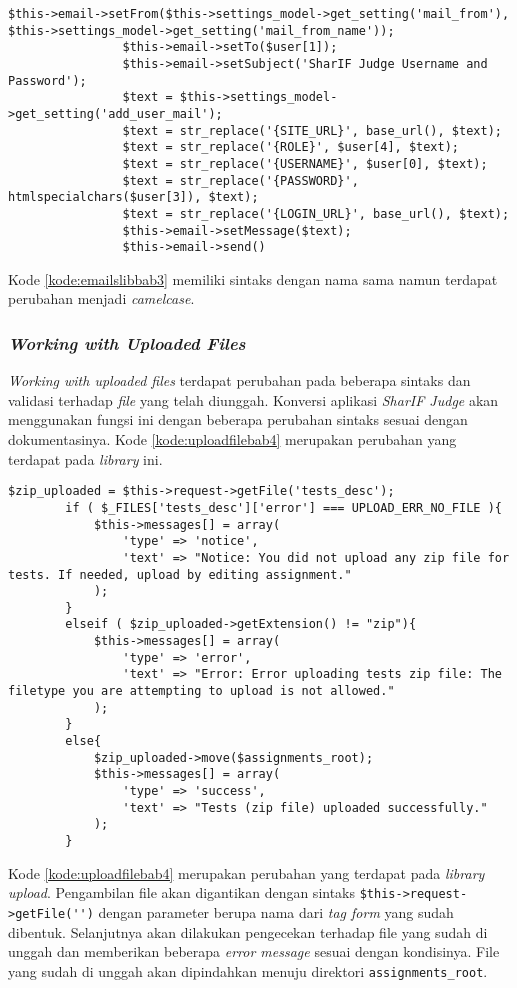 \begin{lstlisting}[caption=Perubahan penggunaan sintaks pada \textit{library emails}, label=kode:emailslibbab3]
$this->email->setFrom($this->settings_model->get_setting('mail_from'), $this->settings_model->get_setting('mail_from_name'));
				$this->email->setTo($user[1]);
				$this->email->setSubject('SharIF Judge Username and Password');
				$text = $this->settings_model->get_setting('add_user_mail');
				$text = str_replace('{SITE_URL}', base_url(), $text);
				$text = str_replace('{ROLE}', $user[4], $text);
				$text = str_replace('{USERNAME}', $user[0], $text);
				$text = str_replace('{PASSWORD}', htmlspecialchars($user[3]), $text);
				$text = str_replace('{LOGIN_URL}', base_url(), $text);
				$this->email->setMessage($text);
				$this->email->send()
\end{lstlisting}

Kode \ref{kode:emailslibbab3} memiliki sintaks dengan nama sama namun terdapat perubahan menjadi \textit{camelcase}.

\subsubsection{\textit{Working with Uploaded Files}}
\textit{Working with uploaded files} terdapat perubahan pada beberapa sintaks dan validasi terhadap \textit{file} yang telah diunggah. Konversi aplikasi \textit{SharIF Judge} akan menggunakan fungsi ini dengan beberapa perubahan sintaks sesuai dengan dokumentasinya. Kode \ref{kode:uploadfilebab4} merupakan perubahan yang terdapat pada \textit{library} ini. 
\begin{lstlisting}[caption=Perancangan perubahan \textit{library upload} pada \textit{CodeIgniter 4}, label=kode:uploadfilebab4]
$zip_uploaded = $this->request->getFile('tests_desc');
		if ( $_FILES['tests_desc']['error'] === UPLOAD_ERR_NO_FILE ){
			$this->messages[] = array(
				'type' => 'notice',
				'text' => "Notice: You did not upload any zip file for tests. If needed, upload by editing assignment."
			);
		}
		elseif ( $zip_uploaded->getExtension() != "zip"){
			$this->messages[] = array(
				'type' => 'error',
				'text' => "Error: Error uploading tests zip file: The filetype you are attempting to upload is not allowed."
			);
		}
		else{
			$zip_uploaded->move($assignments_root);
			$this->messages[] = array(
				'type' => 'success',
				'text' => "Tests (zip file) uploaded successfully."
			);
		}
\end{lstlisting}

Kode \ref{kode:uploadfilebab4} merupakan perubahan yang terdapat pada \textit{library upload}. Pengambilan file akan digantikan dengan sintaks \verb|$this->request->getFile('')| dengan parameter berupa nama dari \textit{tag form} yang sudah dibentuk. Selanjutnya akan dilakukan pengecekan terhadap file yang sudah di unggah dan memberikan beberapa \textit{error message} sesuai dengan kondisinya. File yang sudah di unggah akan dipindahkan menuju direktori \texttt{assignments\_root}. 

